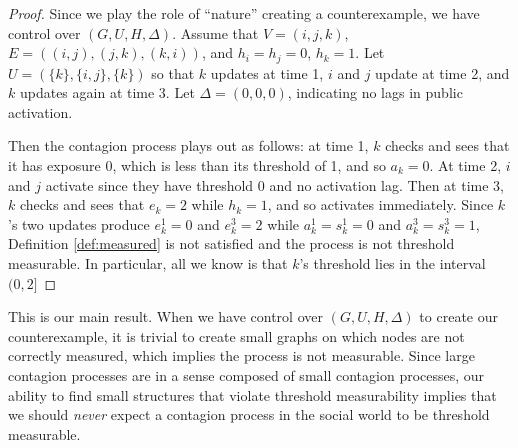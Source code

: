 \documentclass[a4paper]{article}
\newtheorem{definition}{Definition}
\begin{document}
\begin{proof}
Since we play the role of ``nature'' creating a counterexample, we have control over $(G, U, H, \Delta)$. Assume that $V = (i, j, k)$, $E = ((i, j), (j, k), (k, i))$, and $h_i = h_j = 0$, $h_k = 1$. Let $U = (\{k\}, \{i, j\}, \{k\})$ so that $k$ updates at time 1, $i$ and $j$ update at time 2, and $k$ updates again at time 3. Let $\Delta = (0, 0, 0)$, indicating no lags in public activation.

Then the contagion process plays out as follows: at time 1, $k$ checks and sees that it has exposure 0, which is less than its threshold of 1, and so $a_k = 0$. At time 2, $i$ and $j$ activate since they have threshold 0 and no activation lag. Then at time 3, $k$ checks and sees that $e_k = 2$ while $h_k = 1$, and so activates immediately. Since $k$'s two updates produce $e_k^1 = 0$ and $e_k^3 = 2$ while $a_k^1 = s_k^1 = 0$ and $a_k^3 = s_k^3 = 1$, Definition \ref{def:measured} is not satisfied and the process is not threshold measurable. In particular, all we know is that $k$'s threshold lies in the interval $(0, 2]$

\end{proof}

\noindent
This is our main result. When we have control over $(G, U, H, \Delta)$ to create our counterexample, it is trivial to create small graphs on which nodes are not correctly measured, which implies the process is not measurable. Since large contagion processes are in a sense composed of small contagion processes, our ability to find small structures that violate threshold measurability implies that we should \emph{never} expect a contagion process in the social world to be threshold measurable.

\begin{comment}
\begin{definition} \label{def:collision}
A \textbf{collision} occurs if, for some $i$ and some update times $t, t' \in U_i$, more than one neighbor of $i$ activates publicly.
\end{definition}

\noindent
It's clear that collisions cause incorrect measurement of thresholds. The reason measurability fails with no constraints on contagion processes is precisely because collisions occur. Collisions are in a sense inevitable when high degree nodes are present, although the probability of a collision occurring is particular to specific processes, and reliant on assumptions about node update times and graph topology.
\end{comment}
\end{document}
